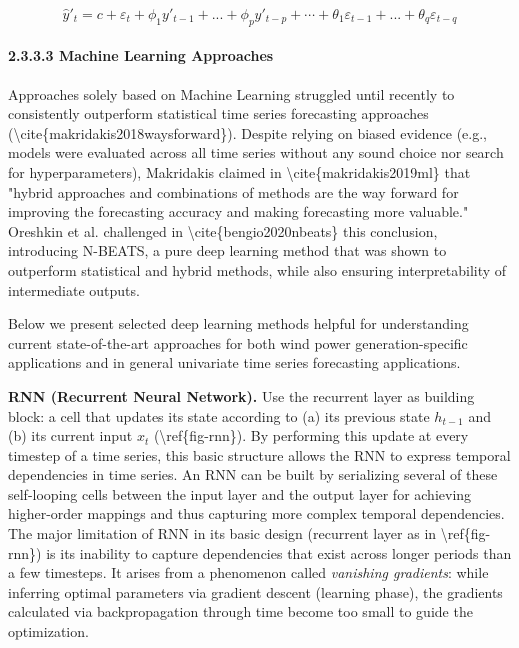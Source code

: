 \documentclass[
]{article}
\begin{document}
\[\hat{y}'_t = c + \varepsilon_t + \phi_1 y'_{t-1} + ... + \phi_p y'_{t-p} + \cdots + \theta_1 \varepsilon_{t-1} + ... + \theta_q \varepsilon_{t-q}\]

\hypertarget{header-n140}{%
\paragraph{2.3.3.3 Machine Learning Approaches}\label{header-n140}}

Approaches solely based on Machine Learning struggled until recently to
consistently outperform statistical time series forecasting approaches
(\textbackslash cite\{makridakis2018waysforward\}). Despite relying on
biased evidence (e.g., models were evaluated across all time series
without any sound choice nor search for hyperparameters), Makridakis
claimed in \textbackslash cite\{makridakis2019ml\} that "hybrid
approaches and combinations of methods are the way forward for improving
the forecasting accuracy and making forecasting more valuable." Oreshkin
et al. challenged in \textbackslash cite\{bengio2020nbeats\} this
conclusion, introducing N-BEATS, a pure deep learning method that was
shown to outperform statistical and hybrid methods, while also ensuring
interpretability of intermediate outputs.

Below we present selected deep learning methods helpful for
understanding current state-of-the-art approaches for both wind power
generation-specific applications and in general univariate time series
forecasting applications.

\textbf{RNN (Recurrent Neural Network).} Use the recurrent layer as
building block: a cell that updates its state according to (a) its
previous state \(h_{t-1}\) and (b) its current input \(x_t\)
(\textbackslash ref\{fig-rnn\}). By performing this update at every
timestep of a time series, this basic structure allows the RNN to
express temporal dependencies in time series. An RNN can be built by
serializing several of these self-looping cells between the input layer
and the output layer for achieving higher-order mappings and thus
capturing more complex temporal dependencies. The major limitation of
RNN in its basic design (recurrent layer as in
\textbackslash ref\{fig-rnn\}) is its inability to capture dependencies
that exist across longer periods than a few timesteps. It arises from a
phenomenon called \emph{vanishing gradients}: while inferring optimal
parameters via gradient descent (learning phase), the gradients
calculated via backpropagation through time become too small to guide
the optimization.
\end{document}
